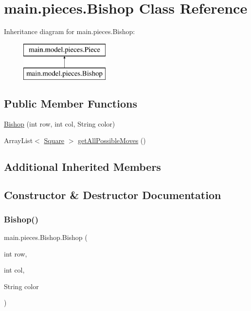 \hypertarget{classmain_1_1pieces_1_1_bishop}{}\section{main.\+pieces.\+Bishop Class Reference}
\label{classmain_1_1pieces_1_1_bishop}
Inheritance diagram for main.\+pieces.\+Bishop\+:\begin{figure}[H]
\begin{center}
\leavevmode
\includegraphics[height=2.000000cm]{classmain_1_1pieces_1_1_bishop}
\end{center}
\end{figure}
\subsection*{Public Member Functions}
\begin{DoxyCompactItemize}
\item 
\hyperlink{classmain_1_1pieces_1_1_bishop_ae30f1350b988e96fddb0fa7ebbddd4d5}{Bishop} (int row, int col, String color)
\item 
Array\+List$<$ \hyperlink{classmain_1_1_square}{Square} $>$ \hyperlink{classmain_1_1pieces_1_1_bishop_a0cd3729654e1172498f4215dd174ec5c}{get\+All\+Possible\+Moves} ()
\end{DoxyCompactItemize}
\subsection*{Additional Inherited Members}


\subsection{Constructor \& Destructor Documentation}
\mbox{\label{classmain_1_1pieces_1_1_bishop_ae30f1350b988e96fddb0fa7ebbddd4d5}} 
\subsubsection{\texorpdfstring{Bishop()}{Bishop()}}
{\footnotesize\ttfamily main.\+pieces.\+Bishop.\+Bishop (\begin{DoxyParamCaption}\item[{int}]{row,  }\item[{int}]{col,  }\item[{String}]{color }\end{DoxyParamCaption})\hspace{0.3cm}{\ttfamily [inline]}}

